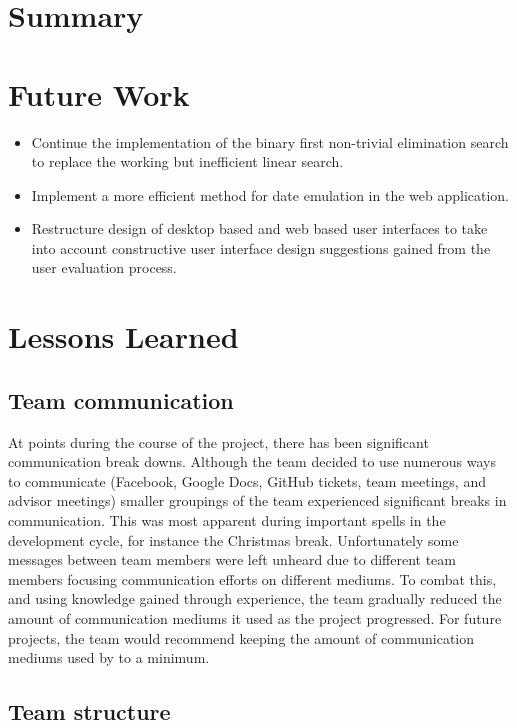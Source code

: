 \section{Summary}

\section{Future Work}

\begin{itemize}
\item Continue the implementation of the binary first non-trivial elimination
search to replace the working but inefficient linear search.
\item Implement a more efficient method for date emulation in the web
application.
\item Restructure design of desktop based and web based user interfaces to
take into account constructive user interface design suggestions gained from
the user evaluation process.
 \end{itemize}

\section{Lessons Learned}

\subsection{Team communication}

At points during the course of the project, there has been significant
communication break downs. Although the team decided to use numerous ways to
communicate (Facebook, Google Docs, GitHub tickets, team meetings, and advisor
meetings) smaller groupings of the team experienced significant breaks in
communication. This was most apparent during important spells in the
development cycle, for instance the Christmas break. Unfortunately some
messages between team members were left unheard due to different team members
focusing communication efforts on different mediums. To combat this, and using
knowledge gained through experience, the team gradually reduced the amount of
communication mediums it used as the project progressed. For future projects,
the team would recommend keeping the amount of communication mediums used by  to
a minimum.

\subsection{Team structure}


